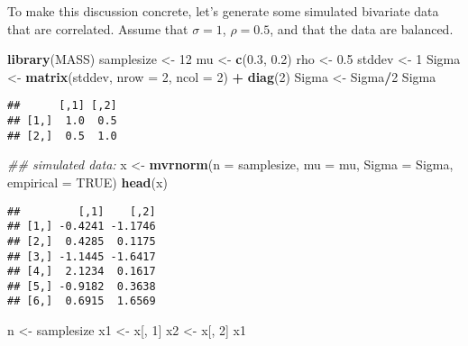\documentclass[12pt,]{krantz}
\newenvironment{Shaded}{\begin{snugshade}}{\end{snugshade}}
\newcommand{\CommentTok}[1]{\textcolor[rgb]{0.56,0.35,0.01}{\textit{#1}}}
\newcommand{\DataTypeTok}[1]{\textcolor[rgb]{0.13,0.29,0.53}{#1}}
\newcommand{\DecValTok}[1]{\textcolor[rgb]{0.00,0.00,0.81}{#1}}
\newcommand{\FloatTok}[1]{\textcolor[rgb]{0.00,0.00,0.81}{#1}}
\newcommand{\KeywordTok}[1]{\textcolor[rgb]{0.13,0.29,0.53}{\textbf{#1}}}
\newcommand{\NormalTok}[1]{#1}
\newcommand{\OperatorTok}[1]{\textcolor[rgb]{0.81,0.36,0.00}{\textbf{#1}}}
\newcommand{\OtherTok}[1]{\textcolor[rgb]{0.56,0.35,0.01}{#1}}
\newcommand{\StringTok}[1]{\textcolor[rgb]{0.31,0.60,0.02}{#1}}
\begin{document}
To make this discussion concrete, let's generate some simulated bivariate data that are correlated. Assume that \(\sigma = 1\),
\(\rho=0.5\), and that the data are balanced.

\begin{Shaded}
\begin{Highlighting}[]
\KeywordTok{library}\NormalTok{(MASS)}
\NormalTok{samplesize <-}\StringTok{ }\DecValTok{12}
\NormalTok{mu <-}\StringTok{ }\KeywordTok{c}\NormalTok{(}\FloatTok{0.3}\NormalTok{, }\FloatTok{0.2}\NormalTok{)}
\NormalTok{rho <-}\StringTok{ }\FloatTok{0.5}
\NormalTok{stddev <-}\StringTok{ }\DecValTok{1}
\NormalTok{Sigma <-}\StringTok{ }\KeywordTok{matrix}\NormalTok{(stddev, }\DataTypeTok{nrow =} \DecValTok{2}\NormalTok{, }\DataTypeTok{ncol =} \DecValTok{2}\NormalTok{) }\OperatorTok{+}\StringTok{ }
\StringTok{  }\KeywordTok{diag}\NormalTok{(}\DecValTok{2}\NormalTok{)}
\NormalTok{Sigma <-}\StringTok{ }\NormalTok{Sigma}\OperatorTok{/}\DecValTok{2}
\NormalTok{Sigma}
\end{Highlighting}
\end{Shaded}

\begin{verbatim}
##      [,1] [,2]
## [1,]  1.0  0.5
## [2,]  0.5  1.0
\end{verbatim}

\begin{Shaded}
\begin{Highlighting}[]
\CommentTok{## simulated data:}
\NormalTok{x <-}\StringTok{ }\KeywordTok{mvrnorm}\NormalTok{(}\DataTypeTok{n =}\NormalTok{ samplesize, }\DataTypeTok{mu =}\NormalTok{ mu, }\DataTypeTok{Sigma =}\NormalTok{ Sigma, }
  \DataTypeTok{empirical =} \OtherTok{TRUE}\NormalTok{)}
\KeywordTok{head}\NormalTok{(x)}
\end{Highlighting}
\end{Shaded}

\begin{verbatim}
##         [,1]    [,2]
## [1,] -0.4241 -1.1746
## [2,]  0.4285  0.1175
## [3,] -1.1445 -1.6417
## [4,]  2.1234  0.1617
## [5,] -0.9182  0.3638
## [6,]  0.6915  1.6569
\end{verbatim}

\begin{Shaded}
\begin{Highlighting}[]
\NormalTok{n <-}\StringTok{ }\NormalTok{samplesize}
\NormalTok{x1 <-}\StringTok{ }\NormalTok{x[, }\DecValTok{1}\NormalTok{]}
\NormalTok{x2 <-}\StringTok{ }\NormalTok{x[, }\DecValTok{2}\NormalTok{]}
\NormalTok{x1}
\end{Highlighting}
\end{Shaded}
\end{document}
